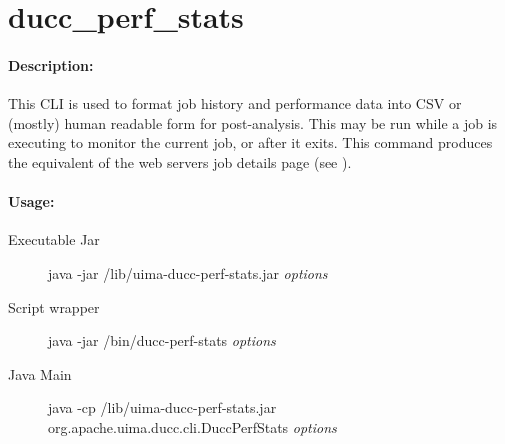    \section{ducc\_perf\_stats}

    \paragraph{Description:}
    This CLI is used to format job history and performance data into CSV or (mostly) human readable
    form for post-analysis.  This may be run while a job is executing to monitor the current job, or
    after it exits.  This command produces the equivalent of the web servers job details page (see
    ).

    \paragraph{Usage:}
    \begin{description}
    \item[Executable Jar] java -jar \ducchome/lib/uima-ducc-perf-stats.jar {\em options}
    \item[Script wrapper] java -jar \ducchome/bin/ducc-perf-stats {\em options}
    \item[Java Main]      java -cp \ducchome/lib/uima-ducc-perf-stats.jar org.apache.uima.ducc.cli.DuccPerfStats {\em options}
    \end{description}

